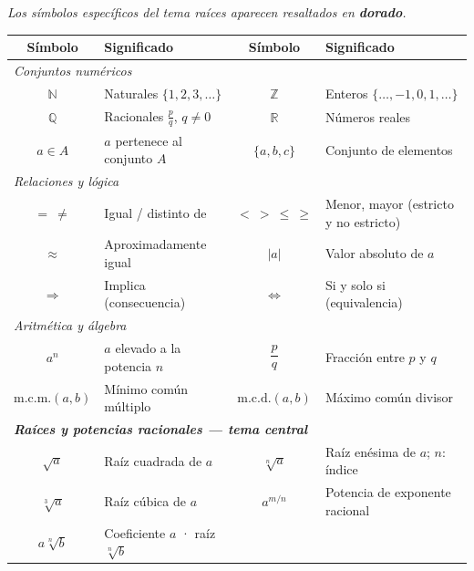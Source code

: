 \documentclass[11pt, letterpaper]{article}
\begin{document}
\begin{tcolorbox}[importantbox, title={Glosario de simbología}]

{\small\textit{Los símbolos específicos del tema raíces aparecen resaltados en \textcolor{zenitgold}{\textbf{dorado}}.}}

\medskip
\begin{center}
\renewcommand{\arraystretch}{1.32}
\begin{tabular}{c p{4.8cm} | c p{4.8cm}}
\toprule
\textbf{Símbolo} & \textbf{Significado} & \textbf{Símbolo} & \textbf{Significado}\\
\midrule
\multicolumn{4}{l}{\textit{Conjuntos numéricos}}\\
$\mathbb{N}$ & Naturales $\{1,2,3,\ldots\}$ &
$\mathbb{Z}$ & Enteros $\{\ldots,-1,0,1,\ldots\}$\\
$\mathbb{Q}$ & Racionales $\frac{p}{q}$, $q\neq 0$ &
$\mathbb{R}$ & Números reales\\
$a \in A$ & $a$ pertenece al conjunto $A$ &
$\{a,b,c\}$ & Conjunto de elementos\\[3pt]
\multicolumn{4}{l}{\textit{Relaciones y lógica}}\\
$=\ \neq$ & Igual / distinto de &
$<\ >\ \leq\ \geq$ & Menor, mayor (estricto y no estricto)\\
$\approx$ & Aproximadamente igual &
$|a|$ & Valor absoluto de $a$\\
$\Rightarrow$ & Implica (consecuencia) &
$\Leftrightarrow$ & Si y solo si (equivalencia)\\[3pt]
\multicolumn{4}{l}{\textit{Aritmética y álgebra}}\\
$a^n$ & $a$ elevado a la potencia $n$ &
$\dfrac{p}{q}$ & Fracción entre $p$ y $q$\\
$\text{m.c.m.}(a,b)$ & Mínimo común múltiplo &
$\text{m.c.d.}(a,b)$ & Máximo común divisor\\[3pt]
\multicolumn{4}{l}{\textit{\textcolor{zenitgold}{\textbf{Raíces y potencias racionales — tema central}}}}\\
\textcolor{zenitgold}{$\sqrt{a}$} & \textcolor{zenitgold}{Raíz cuadrada de $a$} &
\textcolor{zenitgold}{$\sqrt[n]{a}$} & \textcolor{zenitgold}{Raíz enésima de $a$; $n$: índice}\\
\textcolor{zenitgold}{$\sqrt[3]{a}$} & \textcolor{zenitgold}{Raíz cúbica de $a$} &
\textcolor{zenitgold}{$a^{m/n}$} & \textcolor{zenitgold}{Potencia de exponente racional}\\
\textcolor{zenitgold}{$a\sqrt[n]{b}$} & \textcolor{zenitgold}{Coeficiente $a$ · raíz $\sqrt[n]{b}$} &

\end{tabular}
\end{center}
\end{tcolorbox}
\end{document}
